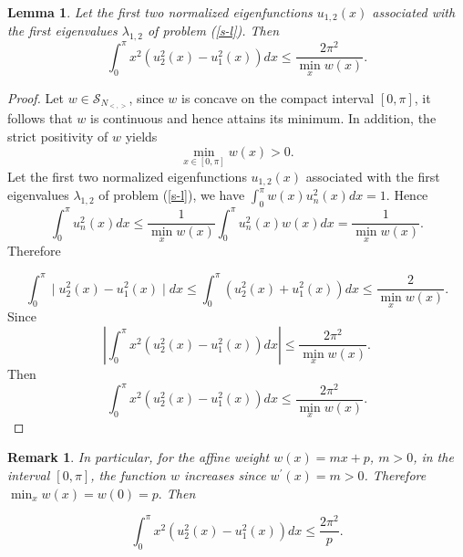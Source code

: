 \documentclass[12pt,a4paper]{amsart}
\newtheorem{rem}{Remark}[section]
\newtheorem{lemma}[theorem]{Lemma}
\begin{document}
\begin{lemma}\label{lemm}
    Let the first two normalized eigenfunctions $u_{1,2}(x)$ associated with the first eigenvalues $\lambda_{1,2}$ of problem (\ref{s-l}). Then
    \[
\int_0^{\pi}x^2(u_2^2(x) -u^2_1(x))dx\leq\frac{2\pi^2}{\min_{x} w(x)}.
\]


\end{lemma}

\begin{proof}
\noindent Let $w \in  \mathcal{S}_{N_{<,>}}$, since $w$ is concave on the compact interval $[0,\pi]$, it follows that $w$ is continuous and hence attains its minimum. In addition, the strict positivity of $w$ yields \[ \min_{x\in [0,\pi]} w(x)>0. \]
\noindent  Let the first two normalized eigenfunctions $u_{1,2}(x)$ associated with the first eigenvalues $\lambda_{1,2}$ of problem (\ref{s-l}), 
we have $\int_0^\pi w(x)u_n^2(x)dx=1$. Hence 
\[
\int_0^{\pi}u_n^2(x)dx\leq
\frac{1}{\min_{x} w(x)}\int_0^{\pi}u_n^2(x)w(x
)dx=\frac{1}{\min_{x} w(x)}.
\]
Therefore 

\[
\int_0^{\pi}\mid u_2^2(x)-u_1^2(x)\mid dx\leq
\int_0^{\pi}( u_2^2(x)+u_1^2(x)) dx\leq
\frac{2}{\min_{x} w(x)}.
\]
Since 
\[
\left| \int_0^{\pi}x^2 (u_2^2(x)-u_1^2(x))dx \right| \leq
\frac{2\pi^2}{\min_{x} w(x)}.
\]
Then
    \[
\int_0^{\pi}x^2(u_2^2(x) -u^2_1(x))dx\leq\frac{2\pi^2}{\min_{x} w(x)}.
\]
    
\end{proof}
\begin{rem}\label{rem12}
    In particular, for the affine weight $w(x)=mx+p$, $m>0$, in the interval $[0,\pi]$, the function $w$ increases since $w^{\prime}(x)=m>0$.
Therefore $\min_{x} w(x)=w(0)=p.$ Then

\[
\int_0^{\pi}x^2(u_2^2(x) -u^2_1(x))dx\leq\frac{2\pi^2}{p}.
\]
\end{rem}
\end{document}
